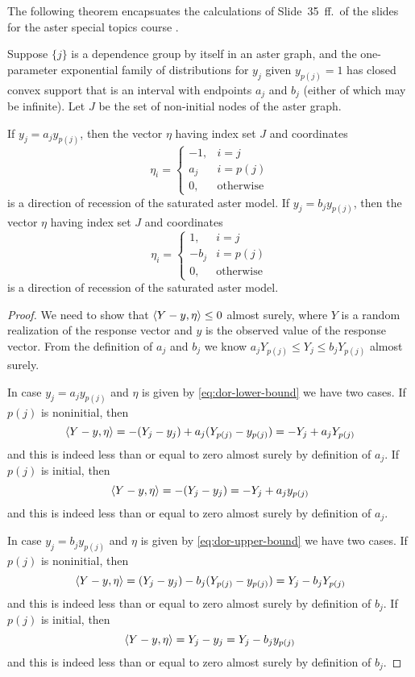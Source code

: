 The following theorem encapsuates the calculations of Slide~35~ff.\ of the
slides for the aster special topics course \citep{geyer-8931-aster}.
\begin{theorem} \label{th:dor-arrow}
Suppose $\{j\}$ is a dependence group by itself in an aster graph, and
the one-parameter exponential family of distributions for $y_j$ given
$y_{p(j)} = 1$ has closed convex support that is an interval with
endpoints $a_j$ and $b_j$ (either of which may be infinite).  Let $J$
be the set of non-initial nodes of the aster graph.

If $y_j = a_j y_{p(j)}$, then the vector $\eta$ having index set $J$
and coordinates
\begin{equation} \label{eq:dor-lower-bound}
   \eta_i = \begin{cases} -1, & i = j \\ a_j & i = p(j) \\
   0, & \text{otherwise} \end{cases}
\end{equation}
is a direction of recession of the saturated aster model.
If $y_j = b_j y_{p(j)}$, then the vector $\eta$ having index set $J$
and coordinates
\begin{equation} \label{eq:dor-upper-bound}
   \eta_i = \begin{cases} 1, & i = j \\ - b_j & i = p(j) \\
   0, & \text{otherwise} \end{cases}
\end{equation}
is a direction of recession of the saturated aster model.
\end{theorem}
\begin{proof}
We need to show that $\langle Y - y, \eta \rangle \le 0$ almost surely,
where $Y$ is a random realization of the response vector and $y$
is the observed value of the response vector.  From the definition
of $a_j$ and $b_j$ we know $a_j Y_{p(j)} \le Y_j \le b_j Y_{p(j)}$
almost surely.

In case $y_j = a_j y_{p(j)}$ and $\eta$ is
given by \eqref{eq:dor-lower-bound} we have two cases.
If $p(j)$ is noninitial, then
$$
   \langle Y - y, \eta \rangle = - (Y_j - y_j) + a_j (Y_{p(j)} - y_{p(j)})
   =
   - Y_j + a_j Y_{p(j)}
$$
and this is indeed less than or equal to zero almost surely by definition
of $a_j$.
If $p(j)$ is initial, then
$$
   \langle Y - y, \eta \rangle = - (Y_j - y_j)
   =
   - Y_j + a_j y_{p(j)}
$$
and this is indeed less than or equal to zero almost surely by definition
of $a_j$.

In case $y_j = b_j y_{p(j)}$ and $\eta$ is
given by \eqref{eq:dor-upper-bound} we have two cases.
If $p(j)$ is noninitial, then
$$
   \langle Y - y, \eta \rangle = (Y_j - y_j) - b_j (Y_{p(j)} - y_{p(j)})
   =
   Y_j - b_j Y_{p(j)}
$$
and this is indeed less than or equal to zero almost surely by definition
of $b_j$.
If $p(j)$ is initial, then
$$
   \langle Y - y, \eta \rangle = Y_j - y_j
   =
   Y_j - b_j y_{p(j)}
$$
and this is indeed less than or equal to zero almost surely by definition
of $b_j$.
\end{proof}
